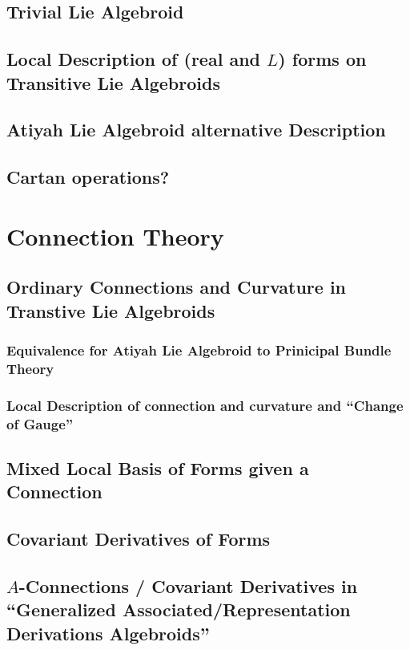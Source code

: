 \documentclass[12pt]{report}
\theoremstyle{definition}
\begin{document}
\section{Trivial Lie Algebroid}
\section{Local Description of (real and $L$) forms on Transitive Lie Algebroids}
\section{Atiyah Lie Algebroid alternative Description}
\section{Cartan operations?}



\chapter{Connection Theory}\label{chp:KMS}


\section{Ordinary Connections and Curvature in Transtive Lie Algebroids}
\subsection{Equivalence for Atiyah Lie Algebroid to Prinicipal Bundle Theory}
\subsection{Local Description of connection and curvature and ``Change of Gauge''}

\section{Mixed Local Basis of Forms given a Connection}

\section{Covariant Derivatives of Forms}

\section{$A$-Connections / Covariant Derivatives in ``Generalized Associated/Representation Derivations Algebroids''}
\end{document}
